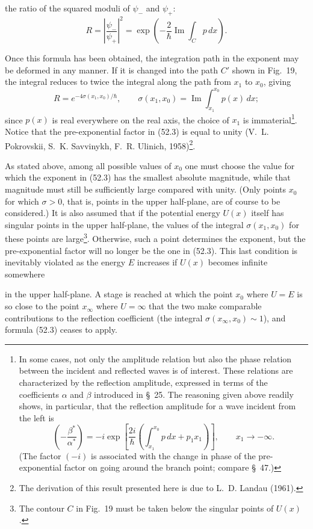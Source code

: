 the ratio of the squared moduli of $\psi_-$ and $\psi_+$:
\begin{equation}
 R=\left|\frac{\psi_-}{\psi_+}\right|^2
 =\exp\left(-\frac2\hbar\operatorname{Im}\int_Cp\,dx\right).
 \tag{52.2}
\end{equation}

Once this formula has been obtained, the integration path in the exponent may
be deformed in any manner. If it is changed into the path $C'$ shown in
Fig.~19, the integral reduces to twice the integral along the path from $x_1$
to $x_0$, giving
\begin{equation}
 R=e^{-4\sigma(x_1,x_0)/\hbar},\qquad
 \sigma(x_1,x_0)=\operatorname{Im}\int_{x_1}^{x_0}p(x)\,dx;
 \tag{52.3}
\end{equation}
since $p(x)$ is real everywhere on the real axis, the choice of $x_1$ is
immaterial\footnote{In some cases, not only the amplitude relation but also
the phase relation between the incident and reflected waves is of interest.
These relations are characterized by the reflection amplitude, expressed in
terms of the coefficients $\alpha$ and $\beta$ introduced in \S~25. The
reasoning given above readily shows, in particular, that the reflection
amplitude for a wave incident from the left is
\[
 \left(-\frac{\beta^*}{\alpha^*}\right)
 =-i\exp\left[\frac{2i}{\hbar}\left(
 \int_{x_1}^{x_0}p\,dx+p_1x_1\right)\right],\qquad x_1\to-\infty.
\]
(The factor $(-i)$ is associated with the change in phase of the
pre-exponential factor on going around the branch point; compare \S~47.)}.
Notice that the pre-exponential factor in (52.3) is equal to unity
(V.~L. Pokrovskii, S.~K. Savvinykh, F.~R. Ulinich, 1958)\footnote{The
derivation of this result presented here is due to L.~D. Landau (1961).}.

As stated above, among all possible values of $x_0$ one must choose the value
for which the exponent in (52.3) has the smallest absolute magnitude, while
that magnitude must still be sufficiently large compared with unity. (Only
points $x_0$ for which $\sigma>0$, that is, points in the upper half-plane,
are of course to be considered.) It is also assumed that if the potential
energy $U(x)$ itself has singular points in the upper half-plane, the values of
the integral $\sigma(x_1,x_0)$ for these points are large\footnote{The contour
$C$ in Fig.~19 must be taken below the singular points of $U(x)$.}. Otherwise,
such a point determines the exponent, but the pre-exponential factor will no
longer be the one in (52.3). This last condition is inevitably violated as the
energy $E$ increases if $U(x)$ becomes infinite somewhere

in the upper half-plane. A stage is reached at which the point $x_0$ where
$U=E$ is so close to the point $x_\infty$ where $U=\infty$ that the two make
comparable contributions to the reflection coefficient (the integral
$\sigma(x_\infty,x_0)\sim1$), and formula (52.3) ceases to apply.

